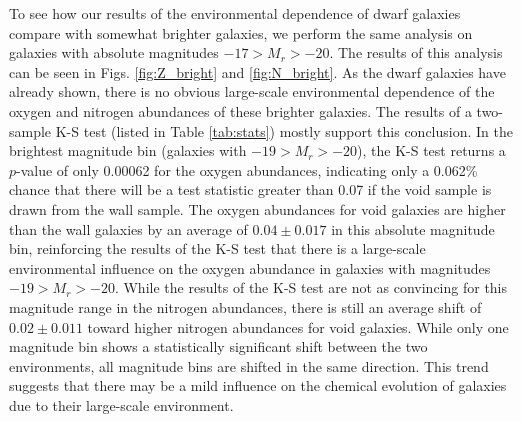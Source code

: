 To see how our results of the environmental dependence of dwarf galaxies compare 
with somewhat brighter galaxies, we perform the same analysis on galaxies with 
absolute magnitudes $-17 > M_r > -20$.  The results of this analysis can be seen 
in Figs. \ref{fig:Z_bright} and \ref{fig:N_bright}.  As the dwarf galaxies have 
already shown, there is no obvious large-scale environmental dependence of the 
oxygen and nitrogen abundances of these brighter galaxies.  The results of a 
two-sample K-S test (listed in Table \ref{tab:stats}) mostly support this 
conclusion.  In the brightest magnitude bin (galaxies with $-19 > M_r > -20$), 
the K-S test returns a $p$-value of only 0.00062 for the oxygen abundances, 
indicating only a 0.062\% chance that there will be a test statistic greater 
than 0.07 if the void sample is drawn from the wall sample.  The oxygen 
abundances for void galaxies are higher than the wall galaxies by an average of 
$0.04\pm 0.017$ in this absolute magnitude bin, reinforcing the results of the 
K-S test that there is a large-scale environmental influence on the oxygen 
abundance in galaxies with magnitudes $-19 > M_r > -20$.  While the results of 
the K-S test are not as convincing for this magnitude range in the nitrogen 
abundances, there is still an average shift of $0.02\pm 0.011$ toward higher 
nitrogen abundances for void galaxies.  While only one magnitude bin shows a 
statistically significant shift between the two environments, all magnitude bins 
are shifted in the same direction.  This trend suggests that there may be a mild 
influence on the chemical evolution of galaxies due to their large-scale 
environment.

